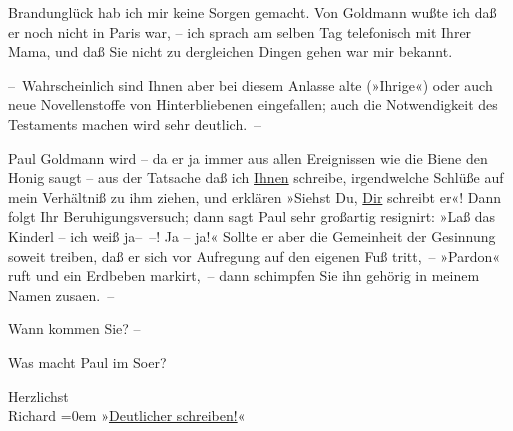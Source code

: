                Brandunglück hab ich mir keine Sorgen gemacht. Von Goldmann wußte ich daß er noch nicht in Paris war, – ich sprach am selben {\pb}Tag telefonisch mit Ihrer Mama, und daß Sie nicht zu
               dergleichen Dingen gehen war mir bekannt.\pend
           
\pstart
           – Wahrscheinlich sind Ihnen aber bei diesem Anlasse alte (»Ihrige«) oder auch neue
               Novellenstoffe von Hinterbliebenen eingefallen; auch {\pb}die Notwendigkeit des Testaments
               machen wird sehr deutlich. –\pend
           
\pstart
           Paul Goldmann wird – da er ja immer aus allen
               Ereignissen wie die Biene den Honig saugt – aus der Tatsache daß ich \uline{Ihnen} schreibe, irgendwelche Schlüße auf mein Verhältniß zu
               ihm ziehen, und erklären {\pb}»Siehst
               Du, \uline{Dir} schreibt er«! Dann folgt Ihr
               Beruhigungsversuch; dann sagt Paul sehr
               großartig resignirt: »Laß das Kinderl – ich weiß ja– –! Ja – ja!« Sollte er aber die
               Gemeinheit der Gesinnung soweit treiben, daß er sich vor Aufregung {\pb}auf den eigenen Fuß tritt, –
               »Pardon« ruft und ein Erdbeben markirt, – dann schimpfen Sie ihn gehörig in meinem
               Namen zusa{\geminationm}en. –\pend
           
\pstart
           Wann kommen Sie? –\pend
           
\pstart
           Was macht Paul im So{\geminationm}er?\pend
           
\pstart
           Herzlichst{\\[\baselineskip]}\spacefill\mbox{Richard}\pend
           \leftskip=0em{}
\pstart
           »\uline{Deutlicher schreiben!}«\pend
           \endnumbering{}  
      